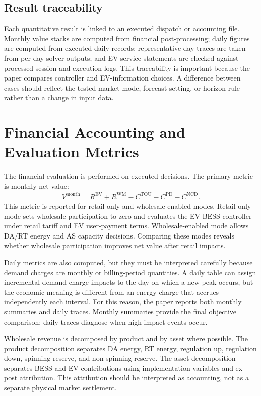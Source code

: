 \documentclass[final,5p,times]{elsarticle}
\newcommand{\EV}{\mathrm{EV}}
\newcommand{\TOU}{\mathrm{TOU}}
\newcommand{\PD}{\mathrm{PD}}
\newcommand{\NCD}{\mathrm{NCD}}
\newcommand{\WM}{\mathrm{WM}}
\begin{document}
\subsection{Result traceability}
Each quantitative result is linked to an executed dispatch or accounting file. Monthly value stacks are computed from financial post-processing; daily figures are computed from executed daily records; representative-day traces are taken from per-day solver outputs; and EV-service statements are checked against processed session and execution logs. This traceability is important because the paper compares controller and EV-information choices. A difference between cases should reflect the tested market mode, forecast setting, or horizon rule rather than a change in input data.

\section{Financial Accounting and Evaluation Metrics}
\label{sec:metrics}

The financial evaluation is performed on executed decisions. The primary metric is monthly net value:
\begin{align}
V^{\mathrm{month}}=R^{\EV}+R^{\WM}-C^{\TOU}-C^{\PD}-C^{\NCD}.
\label{eq:month_value_metric}
\end{align}
This metric is reported for retail-only and wholesale-enabled modes. Retail-only mode sets wholesale participation to zero and evaluates the EV-BESS controller under retail tariff and EV user-payment terms. Wholesale-enabled mode allows DA/RT energy and AS capacity decisions. Comparing these modes reveals whether wholesale participation improves net value after retail impacts.

Daily metrics are also computed, but they must be interpreted carefully because demand charges are monthly or billing-period quantities. A daily table can assign incremental demand-charge impacts to the day on which a new peak occurs, but the economic meaning is different from an energy charge that accrues independently each interval. For this reason, the paper reports both monthly summaries and daily traces. Monthly summaries provide the final objective comparison; daily traces diagnose when high-impact events occur.

Wholesale revenue is decomposed by product and by asset where possible. The product decomposition separates DA energy, RT energy, regulation up, regulation down, spinning reserve, and non-spinning reserve. The asset decomposition separates BESS and EV contributions using implementation variables and ex-post attribution. This attribution should be interpreted as accounting, not as a separate physical market settlement.
\end{document}
